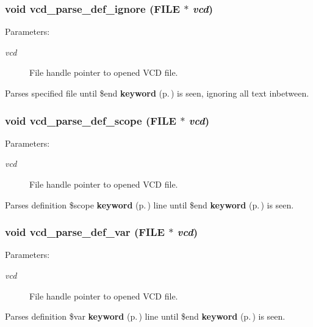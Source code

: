 \subsubsection{\setlength{\rightskip}{0pt plus 5cm}void vcd\_\-parse\_\-def\_\-ignore (FILE $\ast$ {\em vcd})}\label{vcd_8c_a4}


\begin{Desc}
\item[Parameters: ]\par
\begin{description}
\item[{\em 
vcd}]File handle pointer to opened VCD file.\end{description}
\end{Desc}
Parses specified file until \$end {\bf keyword} {\rm (p.\,\pageref{structkeyword})} is seen, ignoring all text inbetween. 
\subsubsection{\setlength{\rightskip}{0pt plus 5cm}void vcd\_\-parse\_\-def\_\-scope (FILE $\ast$ {\em vcd})}\label{vcd_8c_a6}


\begin{Desc}
\item[Parameters: ]\par
\begin{description}
\item[{\em 
vcd}]File handle pointer to opened VCD file.\end{description}
\end{Desc}
Parses definition \$scope {\bf keyword} {\rm (p.\,\pageref{structkeyword})} line until \$end {\bf keyword} {\rm (p.\,\pageref{structkeyword})} is seen. 
\subsubsection{\setlength{\rightskip}{0pt plus 5cm}void vcd\_\-parse\_\-def\_\-var (FILE $\ast$ {\em vcd})}\label{vcd_8c_a5}


\begin{Desc}
\item[Parameters: ]\par
\begin{description}
\item[{\em 
vcd}]File handle pointer to opened VCD file.\end{description}
\end{Desc}
Parses definition \$var {\bf keyword} {\rm (p.\,\pageref{structkeyword})} line until \$end {\bf keyword} {\rm (p.\,\pageref{structkeyword})} is seen. 
